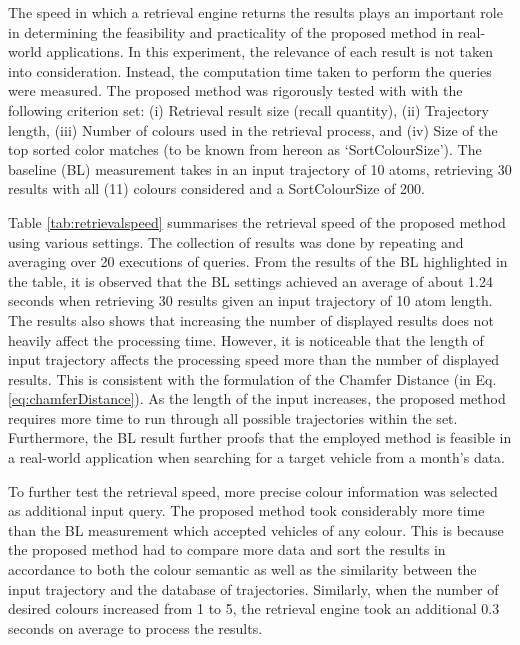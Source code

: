 The speed in which a retrieval engine returns the results plays an important role in determining the feasibility and practicality of the proposed method in real-world applications. In this experiment, the relevance of each result is not taken into consideration. Instead, the computation time taken to perform the queries were measured. The proposed method was rigorously tested with with the following criterion set: (i) Retrieval result size (recall quantity), (ii) Trajectory length, (iii) Number of colours used in the retrieval process, and (iv) Size of the top sorted color matches (to be known from hereon as `SortColourSize'). The baseline (BL) measurement takes in an input trajectory of 10 atoms, retrieving 30 results with all (11) colours considered and a SortColourSize of 200.

Table \ref{tab:retrievalspeed} summarises the retrieval speed of the proposed method using various settings. The collection of results was done by repeating and averaging over 20 executions of queries. From the results of the BL highlighted in the table, it is observed that the BL settings achieved an average of about 1.24 seconds when retrieving 30 results given an input trajectory of 10 atom length. The results also shows that increasing the number of displayed results does not heavily affect the processing time. However, it is noticeable that the length of input trajectory affects the processing speed more than the number of displayed results. This is consistent with the formulation of the Chamfer Distance (in Eq. \ref{eq:chamferDistance}). As the length of the input increases, the proposed method requires more time to run through all possible trajectories within the set. Furthermore, the BL result further proofs that the employed method is feasible in a real-world application when searching for a target vehicle from a month's data.  

To further test the retrieval speed, more precise colour information was selected as additional input query. The proposed method took considerably more time than the BL measurement which accepted vehicles of any colour. This is because the proposed method had to compare more data and sort the results in accordance to both the colour semantic as well as the similarity between the input trajectory and the database of trajectories. Similarly, when the number of desired colours increased from 1 to 5, the retrieval engine took an additional 0.3 seconds on average to process the results.

